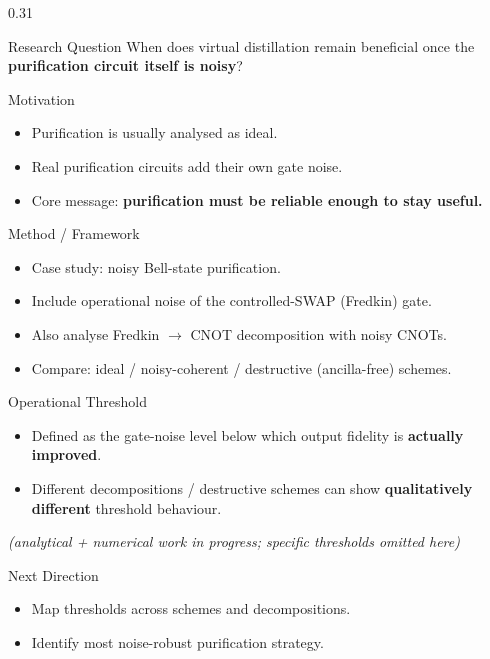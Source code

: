 \documentclass[final]{beamer}
\begin{document}
\begin{frame}[t]
\begin{columns}[t]
\begin{column}{0.31\textwidth}
\begin{block}{Research Question}
  \RaggedRight
  When does virtual distillation remain beneficial once the
  \textbf{purification circuit itself is noisy}?
\end{block}

\begin{block}{Motivation}
  \begin{itemize}
    \item Purification is usually analysed as ideal.
    \item Real purification circuits add their own gate noise.
    \item Core message: \textbf{purification must be reliable
          enough to stay useful.}
  \end{itemize}
\end{block}

\begin{block}{Method / Framework}
  \begin{itemize}
    \item Case study: noisy Bell-state purification.
    \item Include operational noise of the controlled-SWAP
          (Fredkin) gate.
    \item Also analyse Fredkin $\to$ CNOT decomposition with
          noisy CNOTs.
    \item Compare: ideal / noisy-coherent / destructive
          (ancilla-free) schemes.
  \end{itemize}
\end{block}

\begin{block}{Operational Threshold}
  \begin{itemize}
    \item Defined as the gate-noise level below which
          output fidelity is \textbf{actually improved}.
    \item Different decompositions / destructive schemes can show
          \textbf{qualitatively different} threshold behaviour.
  \end{itemize}
  \footnotesize\itshape (analytical + numerical work in progress;
  specific thresholds omitted here)
\end{block}

\begin{block}{Next Direction}
  \begin{itemize}
    \item Map thresholds across schemes and decompositions.
    \item Identify most noise-robust purification strategy.
  \end{itemize}
\end{block}


\end{column}
\end{columns}
\end{frame}
\end{document}
